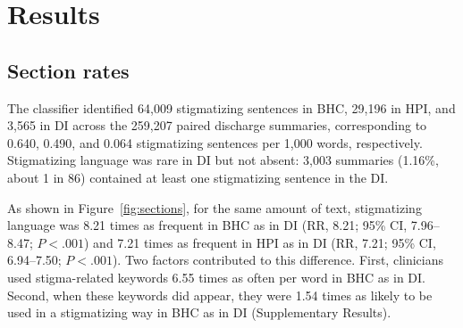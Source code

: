 \documentclass[unnumsec,webpdf,contemporary,large]{oup-authoring-template}
\begin{document}
\section{Results}

\subsection{Section rates}
The classifier identified 64,009 stigmatizing sentences in BHC, 29,196 in HPI, and 3,565 in DI across the 259,207 paired discharge summaries, corresponding to 0.640, 0.490, and 0.064 stigmatizing sentences per 1,000 words, respectively. Stigmatizing language was rare in DI but not absent: 3,003 summaries (1.16\%, about 1 in 86) contained at least one stigmatizing sentence in the DI. 

As shown in Figure~\ref{fig:sections}, for the same amount of text, stigmatizing language was 8.21 times as frequent in BHC as in DI (RR, 8.21; 95\% CI, 7.96--8.47; $P<.001$) and 7.21 times as frequent in HPI as in DI (RR, 7.21; 95\% CI, 6.94--7.50; $P<.001$). Two factors contributed to this difference. First, clinicians used stigma-related keywords 6.55 times as often per word in BHC as in DI. Second, when these keywords did appear, they were 1.54 times as likely to be used in a stigmatizing way in BHC as in DI (Supplementary Results).

\end{document}
